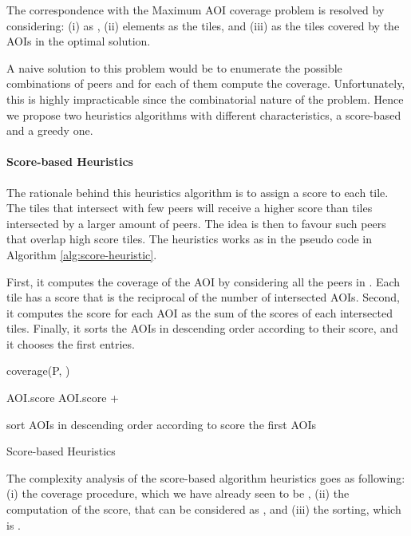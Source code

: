 \documentclass[final,10pt,a5paper]{phdimt}
\theoremstyle{definition}
\begin{document}
The correspondence with the Maximum AOI coverage problem is resolved by considering: (i)  as , (ii) elements as the tiles, and (iii)  as the tiles covered by the AOIs in the optimal solution.


A naive solution to this problem would be to enumerate the possible combinations of peers and for each of them compute the coverage.
Unfortunately, this is highly impracticable since the combinatorial nature of the problem. 
Hence we propose two heuristics algorithms with different characteristics, a score-based and a greedy one.




\paragraph{Score-based Heuristics}
The rationale behind this heuristics algorithm is to assign a score to each tile. The tiles that intersect with few peers will receive a higher score than tiles intersected by a larger amount of peers. The idea is then to favour such peers that overlap high score tiles. The heuristics works as in the pseudo code in Algorithm \ref{alg:score-heuristic}. 

First, it computes the coverage of the AOI by considering all the peers in . 
Each tile has a score that is the reciprocal of the number of intersected AOIs.
Second, it computes the score for each AOI as the sum of the scores of each intersected tiles.
Finally, it sorts the AOIs in descending order according to their score, and it chooses the first  entries.



\begin{algorithm}[tbh]

\BlankLine


coverage(P, )\;

{
  {
    {
      AOI.score  AOI.score + \;   
    }
  }
}

sort AOIs in descending order according to score\;
\Return the first  AOIs\;

\caption{Score-based Heuristics}\label{alg:score-heuristic}
\end{algorithm}


The complexity analysis of the score-based algorithm heuristics goes as following: 
(i) the coverage procedure, which we have already seen to be , 
(ii) the computation of the score, that can be considered as , 
and (iii) the sorting, which is . 
\end{document}
